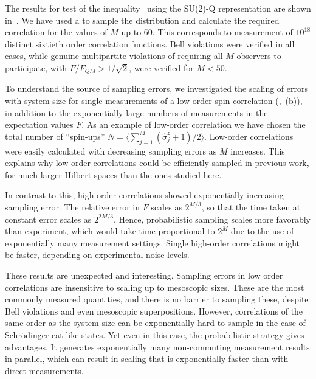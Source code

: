 
The results for test of the inequality~ using the SU(2)-Q representation are shown in~.
We have used a  to sample the distribution and calculate the required correlation for the values of $M$ up to $60$.
This corresponds to measurement of $10^{18}$ distinct sixtieth order correlation functions.
Bell violations were verified in all cases, while genuine multipartite violations of  requiring all $M$ observers to participate, with $F/F_{QM}>1/\sqrt{2}$, were verified for $M<50$.

To understand the source of sampling errors, we investigated the scaling of errors with system-size for single measurements of a low-order spin correlation (,~(b)), in addition to the exponentially large numbers of measurements in the expectation values $F$.
As an example of low-order correlation we have chosen the total number of ``spin-ups'' $N = \langle\sum_{j=1}^M (\hat{\sigma}_j^z + 1 )/2 \rangle$.
Low-order correlations were easily calculated with decreasing sampling errors as $M$ increases.
This explains why low order correlations could be efficiently sampled in previous work, for much larger Hilbert spaces than the ones studied here.

In contrast to this, high-order correlations showed exponentially increasing sampling error.
The relative error in $F$ scales as $2^{M/3}$, so that the time taken at constant error scales as $2^{2M/3}$.
Hence, probabilistic sampling scales more favorably than experiment, which would take time proportional to $2^M$ due to the use of exponentially many measurement settings.
Single high-order correlations might be faster, depending on experimental noise levels.

These results are unexpected and interesting.
Sampling errors in low order correlations are insensitive to scaling up to mesoscopic sizes.
These are the most commonly measured quantities, and there is no barrier to sampling these, despite Bell violations and even mesoscopic superpositions.
However, correlations of the same order as the system size can be exponentially hard to sample in the case of Schr\"odinger cat-like states.
Yet even in this case, the probabilistic strategy gives advantages.
It generates exponentially many non-commuting measurement results in parallel, which can result in scaling that is exponentially faster than with direct measurements.

